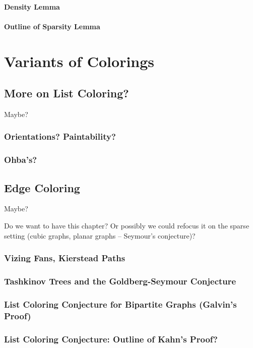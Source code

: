 \documentclass[12pt,twoside,openright,a4paper]{book}
\begin{document}
\subsection{Density Lemma}
\subsection{Outline of Sparsity Lemma}

\part{Variants of Colorings}

\chapter{More on List Coloring?}

Maybe?

\section{Orientations? Paintability?}
\section{Ohba's?}

\chapter{Edge Coloring}

Maybe?

Do we want to have this chapter?  Or possibly we could refocus it on the
sparse setting (cubic graphs, planar graphs -- Seymour's conjecture)?

\section{Vizing Fans, Kierstead Paths}
\section{Tashkinov Trees and the Goldberg-Seymour Conjecture}
\section{List Coloring Conjecture for Bipartite Graphs (Galvin's Proof)}
\section{List Coloring Conjecture: Outline of Kahn's Proof?}
\end{document}
